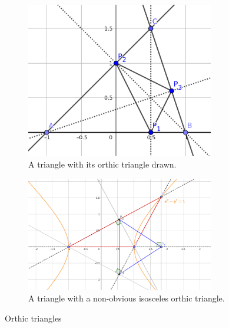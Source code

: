 \begin{figure}[t]
  \centering
  \begin{subfigure}{0.4\textwidth}
    \centering
    \includegraphics[width=0.9\textwidth]{geogebra_setup.png}
    \caption{A triangle with its orthic triangle drawn.}\label{fig:orthic_setup}
  \end{subfigure}%
  \begin{subfigure}{0.6\textwidth}
    \centering
    \includegraphics[width=0.9\textwidth]{geogebra_orthic.png}
    \caption{A triangle with a non-obvious isosceles orthic triangle.}\label{fig:orthic_solution}
  \end{subfigure}
  \caption{Orthic triangles}\label{fig:orthic}
\end{figure}

